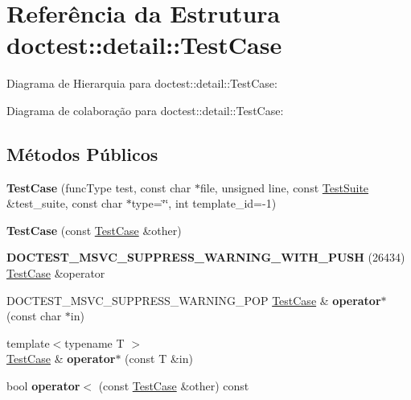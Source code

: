 \hypertarget{structdoctest_1_1detail_1_1TestCase}{}\section{Referência da Estrutura doctest\+:\+:detail\+:\+:Test\+Case}
\label{structdoctest_1_1detail_1_1TestCase}


Diagrama de Hierarquia para doctest\+:\+:detail\+:\+:Test\+Case\+:


Diagrama de colaboração para doctest\+:\+:detail\+:\+:Test\+Case\+:
\subsection*{Métodos Públicos}
\begin{DoxyCompactItemize}
\item 
\mbox{\label{structdoctest_1_1detail_1_1TestCase_a589d99e8322a4d830d5173545cd3dabe}} 
{\bfseries Test\+Case} (func\+Type test, const char $\ast$file, unsigned line, const \hyperlink{structdoctest_1_1detail_1_1TestSuite}{Test\+Suite} \&test\+\_\+suite, const char $\ast$type=\char`\"{}\char`\"{}, int template\+\_\+id=-\/1)
\item 
\mbox{\label{structdoctest_1_1detail_1_1TestCase_a0d8aa1f3d0cbd31f3bc4a74d9c6add23}} 
{\bfseries Test\+Case} (const \hyperlink{structdoctest_1_1detail_1_1TestCase}{Test\+Case} \&other)
\item 
\mbox{\label{structdoctest_1_1detail_1_1TestCase_a3e767f89d496f2dc80ebbab72677c754}} 
{\bfseries D\+O\+C\+T\+E\+S\+T\+\_\+\+M\+S\+V\+C\+\_\+\+S\+U\+P\+P\+R\+E\+S\+S\+\_\+\+W\+A\+R\+N\+I\+N\+G\+\_\+\+W\+I\+T\+H\+\_\+\+P\+U\+SH} (26434) \hyperlink{structdoctest_1_1detail_1_1TestCase}{Test\+Case} \&operator
\item 
\mbox{\label{structdoctest_1_1detail_1_1TestCase_a2bc7eff3ab5c26149f683f2354463cbd}} 
D\+O\+C\+T\+E\+S\+T\+\_\+\+M\+S\+V\+C\+\_\+\+S\+U\+P\+P\+R\+E\+S\+S\+\_\+\+W\+A\+R\+N\+I\+N\+G\+\_\+\+P\+OP \hyperlink{structdoctest_1_1detail_1_1TestCase}{Test\+Case} \& {\bfseries operator$\ast$} (const char $\ast$in)
\item 
\mbox{\label{structdoctest_1_1detail_1_1TestCase_a7ff8c8e9a0e4515dbef926a835b447f9}} 
{\footnotesize template$<$typename T $>$ }\\\hyperlink{structdoctest_1_1detail_1_1TestCase}{Test\+Case} \& {\bfseries operator$\ast$} (const T \&in)
\item 
\mbox{\label{structdoctest_1_1detail_1_1TestCase_a865f5906758263125b68b8d785a05ca1}} 
bool {\bfseries operator$<$} (const \hyperlink{structdoctest_1_1detail_1_1TestCase}{Test\+Case} \&other) const
\end{DoxyCompactItemize}
